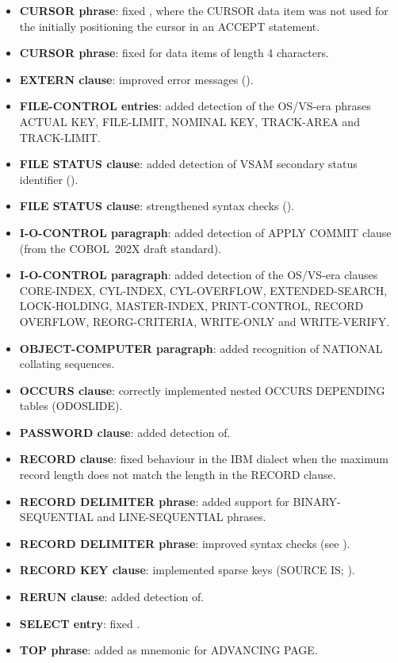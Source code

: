 \begin{itemize}
\item \textbf{CURSOR phrase}: fixed , where the CURSOR data item was not used for the initially positioning the cursor in an ACCEPT statement.
\item \textbf{CURSOR phrase}: fixed for data items of length 4 characters.
\item \textbf{EXTERN clause}: improved error messages ().
\item \textbf{FILE-CONTROL entries}: added detection of the OS\slash{}VS-era phrases ACTUAL KEY, FILE-LIMIT, NOMINAL KEY, TRACK-AREA and TRACK-LIMIT.
\item \textbf{FILE STATUS clause}: added detection of VSAM secondary status identifier ().
\item \textbf{FILE STATUS clause}: strengthened syntax checks ().
\item \textbf{I-O-CONTROL paragraph}: added detection of APPLY COMMIT clause (from the COBOL~202X draft standard).
\item \textbf{I-O-CONTROL paragraph}: added detection of the OS\slash{}VS-era clauses CORE-INDEX, CYL-INDEX, CYL-OVERFLOW, EXTENDED-SEARCH, LOCK-HOLDING, MASTER-INDEX, PRINT-CONTROL, RECORD OVERFLOW, REORG-CRITERIA, WRITE-ONLY and WRITE-VERIFY.
\item \textbf{OBJECT-COMPUTER paragraph}: added recognition of NATIONAL collating sequences.
\item \textbf{OCCURS clause}: correctly implemented nested OCCURS DEPENDING tables (ODOSLIDE).
\item \textbf{PASSWORD clause}: added detection of.
\item \textbf{RECORD clause}: fixed behaviour in the IBM dialect when the maximum record length does not match the length in the RECORD clause.
\item \textbf{RECORD DELIMITER phrase}:  added support for BINARY-SEQUENTIAL and LINE-SEQUENTIAL phrases.
\item \textbf{RECORD DELIMITER phrase}: improved syntax checks (see ).
\item \textbf{RECORD KEY clause}: implemented sparse keys (SOURCE IS; ).
\item \textbf{RERUN clause}: added detection of.
\item \textbf{SELECT entry}: fixed .
\item \textbf{TOP phrase}: added as mnemonic for ADVANCING PAGE.
\end{itemize}


